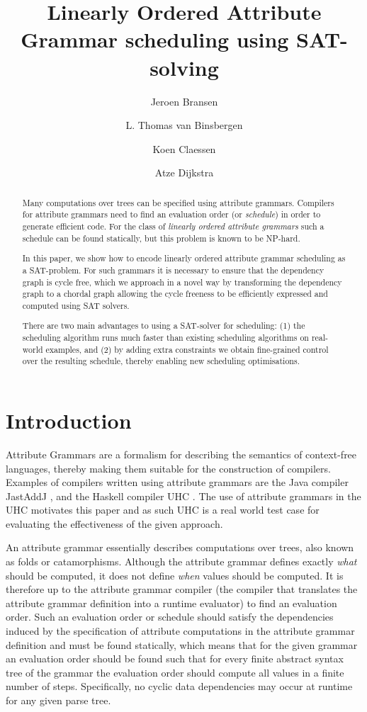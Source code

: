 \documentclass{llncs}
\title{Linearly Ordered Attribute Grammar scheduling using SAT-solving}
\author{Jeroen Bransen\inst{1}  \and L. Thomas van Binsbergen\inst{2,1} \and Koen Claessen\inst{3} \and Atze Dijkstra\inst{1}}
\institute{Utrecht University, Utrecht, The Netherlands, \email{\{J.Bransen,atze\}@uu.nl}
\and Royal Holloway, University of London, Egham, UK, \email{ltvanbinsbergen@acm.org}
\and Chalmers University of Technology, Gothenburg, Sweden, \email{koen@chalmers.se}}
\begin{document}
\maketitle

\begin{abstract}
Many computations over trees can be specified using attribute
grammars. Compilers for attribute grammars need to find an evaluation
order (or {\em schedule}) in order to generate efficient code. For the class
of {\em linearly ordered attribute grammars} such a schedule can be found
statically, but this problem is known to be NP-hard.

In this paper, we show how to encode linearly ordered attribute grammar
scheduling as a SAT-problem. For such grammars it is necessary to ensure that the dependency graph is cycle free, which we approach in a novel way by transforming the dependency graph to a chordal graph allowing the cycle freeness to be efficiently expressed and computed using SAT solvers.

There are two main advantages to using a SAT-solver for scheduling:
(1) the scheduling algorithm runs much faster than existing scheduling
algorithms on real-world examples, and (2) by adding extra constraints
we obtain fine-grained control over the resulting schedule, thereby
enabling new scheduling optimisations.


\end{abstract}

\section{Introduction}
Attribute Grammars \cite{knuth68} are a formalism for describing the semantics of context-free languages, thereby making them suitable for the construction of compilers. Examples of compilers written using attribute grammars are the Java compiler JastAddJ \cite{Ekman:2007}, and the Haskell compiler UHC \cite{Dijkstra:2009}. The use of attribute grammars in the UHC motivates this paper and as such UHC is a real world test case for evaluating the effectiveness of the given approach.

An attribute grammar essentially describes computations over trees, also known as folds or catamorphisms. Although the attribute grammar defines exactly \emph{what} should be computed, it does not define \emph{when} values should be computed. It is therefore up to the attribute grammar compiler (the compiler that translates the attribute grammar definition into a runtime evaluator) to find an evaluation order. Such an evaluation order or schedule should satisfy the dependencies induced by the specification of attribute computations in the attribute grammar definition and must be found statically, which means that for the given grammar an evaluation order should be found such that for every finite abstract syntax tree of the grammar the evaluation order should compute all values in a finite number of steps. Specifically, no cyclic data dependencies may occur at runtime for any given parse tree.
\end{document}
